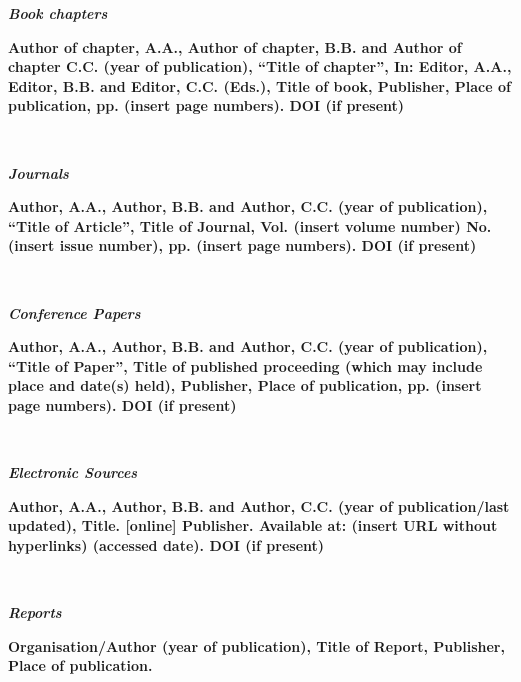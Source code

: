 \documentclass{design}
\begin{document}
\textbf{\textit{Book chapters}}

\begin{hangparas}{0.63cm}{1}
\textbf{Author of chapter, A.A., Author of chapter, B.B. and Author of chapter C.C. (year of publication), “Title of chapter”, In: Editor, A.A., Editor, B.B. and Editor, C.C. (Eds.), Title of book, Publisher, Place of publication, pp. (insert page numbers). DOI (if present)}

\\[-0.5em]
\end{hangparas}

\textbf{\textit{Journals}}

\begin{hangparas}{0.63cm}{1}
\textbf{Author, A.A., Author, B.B. and Author, C.C. (year of publication), “Title of Article”, Title of Journal, Vol. (insert volume number) No. (insert issue number), pp. (insert page numbers). DOI (if present)}

\\[-0.5em]

\end{hangparas}

\textbf{\textit{Conference Papers}}

\begin{hangparas}{0.63cm}{1}
\textbf{Author, A.A., Author, B.B. and Author, C.C. (year of publication), “Title of Paper”, Title of published proceeding (which may include place and date(s) held), Publisher, Place of publication, pp. (insert page numbers). DOI (if present)}

\\[-0.5em]

\end{hangparas}

\textbf{\textit{Electronic Sources}}

\begin{hangparas}{0.63cm}{1}
\textbf{Author, A.A., Author, B.B. and Author, C.C. (year of publication/last updated), Title. [online] Publisher. Available at: (insert URL without hyperlinks) (accessed date). DOI (if present)}

\\[-0.5em]

\end{hangparas}

\textbf{\textit{Reports}}

\begin{hangparas}{0.63cm}{1}
\textbf{Organisation/Author (year of publication), Title of Report, Publisher, Place of publication.}

\\[-0.5em]

\end{hangparas}
\end{document}
